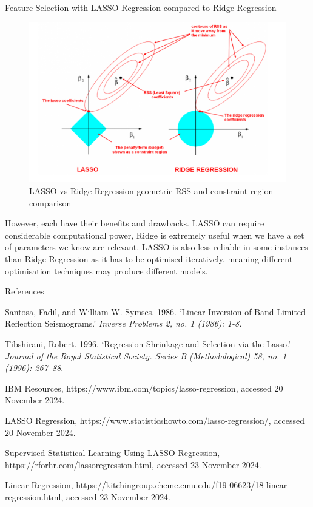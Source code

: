\documentclass[final]{beamer}
\newlength{\onecolwid}
\begin{document}
\begin{frame}[t]
\begin{columns}[t]
\begin{column}{\onecolwid}
\begin{block}{Feature Selection with LASSO Regression compared to Ridge Regression}
{\begin{figure}
    \centering
    \includegraphics[width=0.75\linewidth]{Geometry.png}
    \caption{\; LASSO vs Ridge Regression geometric RSS and constraint region comparison}
\end{figure}
    However, each have their benefits and drawbacks. LASSO can require considerable computational power, Ridge is extremely useful when we have a set of parameters we know are relevant. LASSO is also less reliable in some instances than Ridge Regression as it has to be optimised iteratively, meaning different optimisation techniques may produce different models.}
\end{block}

\vspace{-0.5cm}

 \begin{block}{References}
\begin{itemize}
\tiny{
\vspace{-0.75cm}
Santosa, Fadil, and William W. Symses. 1986. `Linear Inversion of Band-Limited Reflection Seismograms.' \emph{Inverse Problems 2, no. 1 (1986): 1-8.}

Tibshirani, Robert. 1996. `Regression Shrinkage and Selection via the Lasso.' \emph{Journal of the Royal Statistical Society. Series B (Methodological) 58, no. 1 (1996): 267–88}.

IBM Resources, https://www.ibm.com/topics/lasso-regression, accessed 20 November 2024.

LASSO Regression, https://www.statisticshowto.com/lasso-regression/, accessed 20 November 2024.

Supervised Statistical Learning Using LASSO Regression, https://rforhr.com/lassoregression.html, accessed 23 November 2024.

Linear Regression, https://kitchingroup.cheme.cmu.edu/f19-06623/18-linear-regression.html, accessed 23 November 2024.
 }




\end{itemize}
\end{block}
\end{column}
\end{columns}
\end{frame}
\end{document}
